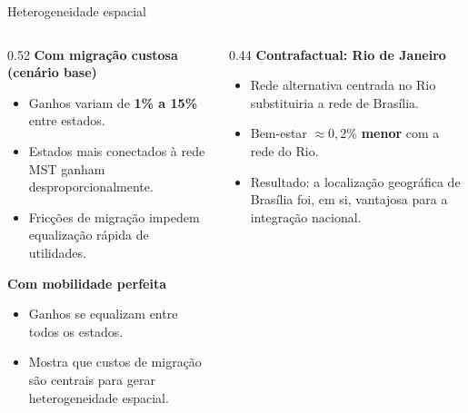 \begin{frame}{Heterogeneidade espacial}
    \begin{columns}[T]
        \begin{column}{0.52\textwidth}
            \textbf{Com migração custosa (cenário base)}
            \begin{itemize}
                \item Ganhos variam de \textbf{1\% a 15\%} entre estados.
                \item Estados mais conectados à rede MST ganham desproporcionalmente.
                \item Fricções de migração impedem equalização rápida de utilidades.
            \end{itemize}

            \vspace{0.3cm}

            \textbf{Com mobilidade perfeita}
            \begin{itemize}
                \item Ganhos se equalizam entre todos os estados.
                \item Mostra que custos de migração são centrais para gerar heterogeneidade espacial.
            \end{itemize}
        \end{column}
        \begin{column}{0.44\textwidth}
            \textbf{Contrafactual: Rio de Janeiro}
            \begin{itemize}
                \item Rede alternativa centrada no Rio substituiria a rede de Brasília.
                \item Bem-estar $\approx 0{,}2\%$ \textbf{menor} com a rede do Rio.
                \item Resultado: a localização geográfica de Brasília foi, em si, vantajosa para a integração nacional.
            \end{itemize}
        \end{column}
    \end{columns}

    \vspace{0.15cm}
\end{frame}
